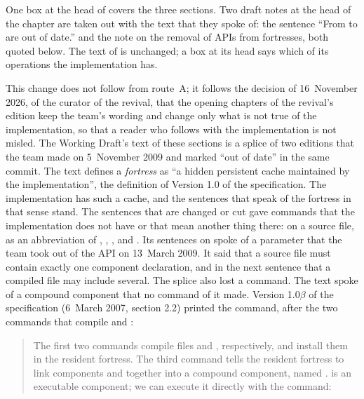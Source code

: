 \begin{description}
One box at the head of  covers the three sections.
Two draft notes at the head of the chapter are taken out with the text that
they spoke of: the sentence ``From  to
 are out of date.'' and the note on the removal of APIs from
fortresses, both quoted below.
The text of  is unchanged; a box at its head says which of
its operations the implementation has.
\item[Rationale] This change does not follow from route~A; it follows the
decision of 16~November 2026, of the curator of the revival, that the opening
chapters of the revival's edition keep the team's wording and change only
what is not true of the implementation, so that a reader who follows
 with the implementation is not misled.
The Working Draft's text of these sections is a splice of two editions that
the team made on 5~November 2009 and marked ``out of date'' in the same
commit.
The text defines a \emph{fortress} as ``a hidden persistent cache maintained
by the implementation'', the definition of Version 1.0 of the specification.
The implementation has such a cache, and the sentences that speak of the
fortress in that sense stand.
The sentences that are changed or cut gave commands that the implementation
does not have or that mean another thing there:  on a
source file,  as an abbreviation of ,
, ,  and
.
Its sentences on  spoke of a parameter  that the team took
out of the API  on 13~March 2009.
It said that a source file must contain exactly one component declaration, and
in the next sentence that a compiled file may include several.
The splice also lost a command.
The text spoke of a compound component  that no command of it
made.
Version 1.0$\beta$ of the specification (6~March 2007, section 2.2) printed
the command, after the two commands that compile  and
:
\begin{quote}

The first two commands compile files  and ,
respectively, and install them in the resident fortress.
The third command tells the resident fortress to link components 
and  together into a compound component, named .
 is an executable component; we can execute it directly with the
command:


\end{quote}
\end{description}
